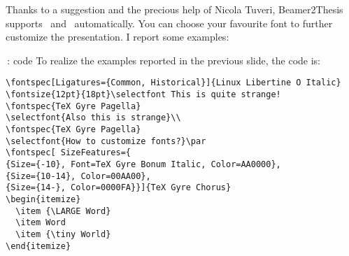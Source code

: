 \begin{tframe}{\XeLaTeX}
Thanks to a suggestion and the precious help of Nicola Tuveri, Beamer2Thesis supports \XeTeX\, and \XeLaTeX\, automatically.
You can choose your favourite font to further customize the presentation. I report some examples:\\
\end{tframe}

\begin{frame}[t,fragile]{\XeLaTeX\,: code}
To realize the examples reported in the previous slide, the code is:
\scriptsize{
\begin{verbatim}
\fontspec[Ligatures={Common, Historical}]{Linux Libertine O Italic}
\fontsize{12pt}{18pt}\selectfont This is quite strange!
\fontspec{TeX Gyre Pagella}
\selectfont{Also this is strange}\\
\fontspec{TeX Gyre Pagella}
\selectfont{How to customize fonts?}\par
\fontspec[ SizeFeatures={
{Size={-10}, Font=TeX Gyre Bonum Italic, Color=AA0000},
{Size={10-14}, Color=00AA00},
{Size={14-}, Color=0000FA}}]{TeX Gyre Chorus}
\begin{itemize}
  \item {\LARGE Word}
  \item Word
  \item {\tiny World}
\end{itemize}
\end{verbatim}
}
\end{frame}


